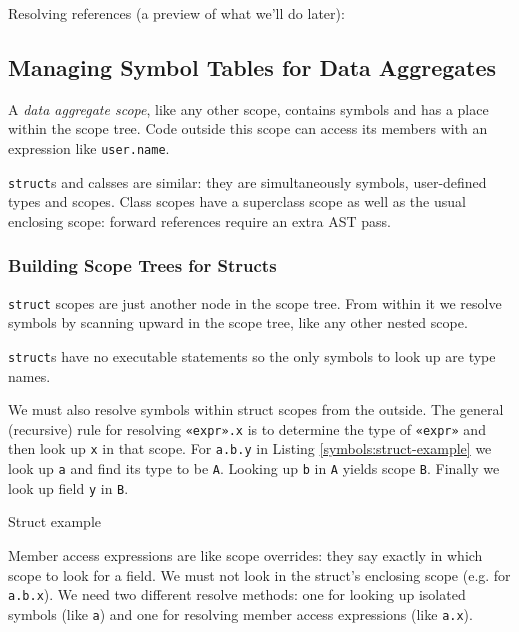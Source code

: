 Resolving references (a preview of what we'll do later):


\subsection{Managing Symbol Tables for Data Aggregates}

A \emph{data aggregate scope}, like any other scope,
contains symbols and has a place within the scope tree.
Code outside this scope can access its members
with an expression like \verb=user.name=.

\verb=struct=s and calsses are similar:
they are simultaneously symbols, user-defined types and scopes.
Class scopes have a superclass scope as well as the usual enclosing scope:
forward references require an extra AST pass.


\subsubsection{Building Scope Trees for Structs}

\verb=struct= scopes are just another node in the scope tree.
From within it we resolve symbols by scanning upward in the scope tree,
like any other nested scope.

\verb=struct=s have no executable statements
so the only symbols to look up are type names.

We must also resolve symbols within struct scopes from the outside.
The general (recursive) rule for resolving \verb=«expr».x=
is to determine the type of \verb=«expr»=
and then look up \verb=x= in that scope.
For \verb=a.b.y= in Listing \ref{symbols:struct-example}
we look up \verb=a= and find its type to be \verb=A=.
Looking up \verb=b= in \verb=A= yields scope \verb=B=.
Finally we look up field \verb=y= in \verb=B=.

\begin{program}
\caption{Struct example\label{symbols:struct-example}}
\end{program}

Member access expressions are like scope overrides:
they say exactly in which scope to look for a field.
We must not look in the struct's enclosing scope (e.g. for \verb=a.b.x=).
We need two different resolve methods:
one for looking up isolated symbols (like \verb=a=)
and one for resolving member access expressions (like \verb=a.x=).


